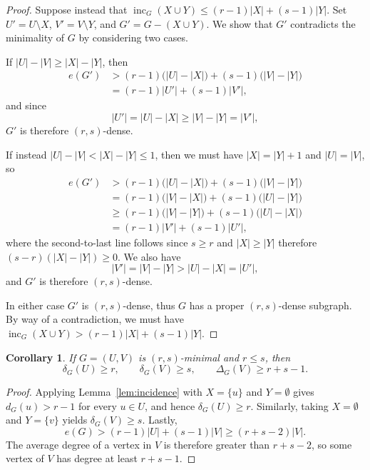 \documentclass[12pt]{article}
\newtheorem{corollary}[theorem]{Corollary}
\theoremstyle{definition}
\theoremstyle{remark}
\newcommand{\inc}{\operatorname{inc}}
\begin{document}
\begin{proof}
Suppose instead that $\inc_G(X\cup Y)\le (r-1)|X|+(s-1)|Y|$. Set $U'=U\setminus X$, $V'=V\setminus Y$, and $G'=G-(X\cup Y)$. We show that $G'$ contradicts the minimality of $G$ by considering two cases.

\noindent If $|U|-|V|\geq |X|-|Y|$, then
\begin{align*}
    e(G')&>(r-1)\bigl(|U|-|X|\bigr)+(s-1)\bigl(|V|-|Y|\bigr)\\
    &=(r-1)|U'|+(s-1)|V'|,
\end{align*}
and since
\[
|U'|=|U|-|X|\geq|V|-|Y|=|V'|,
\]
$G'$ is therefore $(r,s)$-dense.

\noindent If instead $|U|-|V|<|X|-|Y|\leq1$, then we must have $|X|=|Y|+1$ and $|U|=|V|$, so
\begin{align*}
    e(G')&>(r-1)\bigl(|U|-|X|\bigr)+(s-1)\bigl(|V|-|Y|\bigr)\\
    &=(r-1)\bigl(|V|-|X|\bigr)+(s-1)\bigl(|U|-|Y|\bigr)\\
    &\geq(r-1)\bigl(|V|-|Y|\bigr)+(s-1)\bigl(|U|-|X|\bigr)\\
    &=(r-1)|V'|+(s-1)|U'|,
\end{align*}
where the second-to-last line follows since $s\geq r$ and $|X|\geq|Y|$ therefore $(s-r)(|X|-|Y|)\geq0$. We also have 
\[
|V'|=|V|-|Y|>|U|-|X|=|U'|,
\]
and $G'$ is therefore $(r,s)$-dense. 

In either case $G'$ is $(r,s)$-dense, thus $G$ has a proper $(r,s)$-dense subgraph. By way of a contradiction, we must have $\inc_G(X\cup Y)>(r-1)|X|+(s-1)|Y|$.
\end{proof}





\begin{corollary}\label{cor:degrees}
If $G=(U,V)$ is $(r,s)$-minimal and $r\leq s$, then
\[
    \delta_G(U)\ge r,
    \qquad
    \delta_G(V)\ge s,
    \qquad
    \Delta_G(V)\ge r+s-1.
\]
\end{corollary}

\begin{proof}
Applying Lemma~\ref{lem:incidence} with $X=\{u\}$ and $Y=\emptyset$ gives $d_G(u)>r-1$ for every $u\in U$, and hence $\delta_G(U)\ge r$. Similarly, taking $X=\emptyset$ and $Y=\{v\}$ yields $\delta_G(V)\ge s$. Lastly,
\[
    e(G)>(r-1)|U|+(s-1)|V|
    \ge (r+s-2)|V|.
\]
The average degree of a vertex in $V$ is therefore greater than $r+s-2$, so some vertex of $V$ has degree at least $r+s-1$.
\end{proof}
\end{document}
